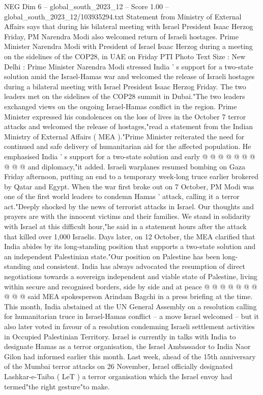 \begin{textsample}{NEG Dim 6 – global\_south\_2023\_12 – Score 1.00 – global\_south\_2023\_12/103935294.txt}  \label{ex:f6_neg_318}
Statement from Ministry of External Affairs says that during his bilateral meeting with Israel President Isaac Herzog Friday, PM Narendra Modi also welcomed return of Israeli hostages.
Prime Minister Narendra Modi with President of Israel Isaac Herzog during a meeting on the sidelines of the COP28, in UAE on Friday PTI Photo Text Size : New Delhi : Prime Minister Narendra Modi stressed India ' s support for a two-state solution amid the Israel-Hamas war and welcomed the release of Israeli hostages during a bilateral meeting with Israel President Isaac Herzog Friday.
The two leaders met on the sidelines of the COP28 summit in Dubai."The two leaders exchanged views on the ongoing Israel-Hamas conflict in the region.
Prime Minister expressed his condolences on the loss of lives in the October 7 terror attacks and welcomed the release of hostages,"read a statement from the Indian Ministry of External Affairs ( MEA )."Prime Minister reiterated the need for continued and safe delivery of humanitarian aid for the affected population.
He emphasised India ' s support for a two-state solution and early @ @ @ @ @ @ @ @ @ @ and diplomacy,"it added.
Israeli warplanes resumed bombing on Gaza Friday afternoon, putting an end to a temporary week-long truce earlier brokered by Qatar and Egypt.
When the war first broke out on 7 October, PM Modi was one of the first world leaders to condemn Hamas ' attack, calling it a terror act."Deeply shocked by the news of terrorist attacks in Israel.
Our thoughts and prayers are with the innocent victims and their families.
We stand in solidarity with Israel at this difficult hour,"he said in a statement hours after the attack that killed over 1,000 Israelis.
Days later, on 12 October, the MEA clarified that India abides by its long-standing position that supports a two-state solution and an independent Palestinian state."Our position on Palestine has been long-standing and consistent.
India has always advocated the resumption of direct negotiations towards a sovereign independent and viable state of Palestine, living within secure and recognised borders, side by side and at peace @ @ @ @ @ @ @ @ @ @ said MEA spokesperson Arindam Bagchi in a press briefing at the time.
This month, India abstained at the UN General Assembly on a resolution calling for humanitarian truce in Israel-Hamas conflict -- a move Israel welcomed -- but it also later voted in favour of a resolution condemning Israeli settlement activities in Occupied Palestinian Territory.
Israel is currently in talks with India to designate Hamas as a terror organisation, the Israel Ambassador to India Naor Gilon had informed earlier this month.
Last week, ahead of the 15th anniversary of the Mumbai terror attacks on 26 November, Israel officially designated Lashkar-e-Taiba ( LeT ) a terror organisation which the Israel envoy had termed"the right gesture"to make.

\end{textsample}

